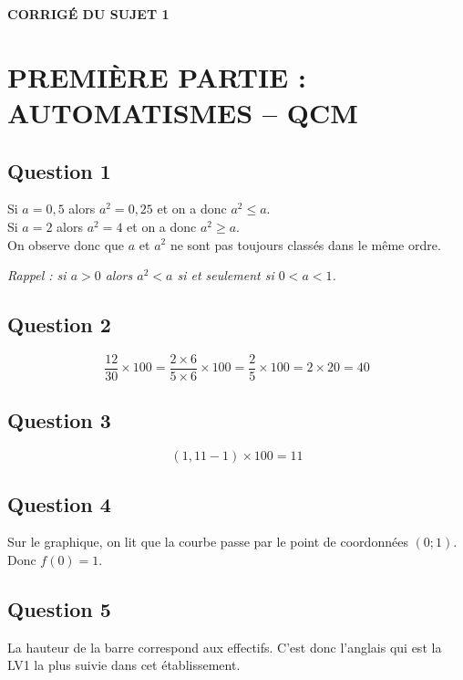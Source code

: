 \documentclass[a4paper,12pt]{article}
\begin{document}
\begin{center}\Large\textbf{CORRIGÉ DU SUJET 1}\end{center}

\section*{PREMIÈRE PARTIE : AUTOMATISMES -- QCM}

\subsection*{Question 1}
Si $a = 0,5$ alors $a^2 = 0,25$ et on a donc $a^2 \leq a$. \\
Si $a = 2$ alors $a^2 = 4$ et on a donc $a^2 \geq a$. \\
On observe donc que $a$ et $a^2$ ne sont pas toujours classés dans le même ordre.


\emph{Rappel : si $a > 0$ alors $a^2 < a$ si et seulement si $0 < a < 1$.}

\subsection*{Question 2}
\[
\frac{12}{30} \times 100 = \frac{2 \times 6}{5 \times 6} \times 100 = \frac{2}{5} \times 100 = 2 \times 20 = 40
\]


\subsection*{Question 3}
\[
(1,11 - 1) \times 100 = 11
\]


\subsection*{Question 4}
Sur le graphique, on lit que la courbe passe par le point de coordonnées $(0;1)$. Donc $f(0) = 1$.


\subsection*{Question 5}
La hauteur de la barre correspond aux effectifs. C'est donc l'anglais qui est la LV1 la plus suivie dans cet établissement.

\end{document}
